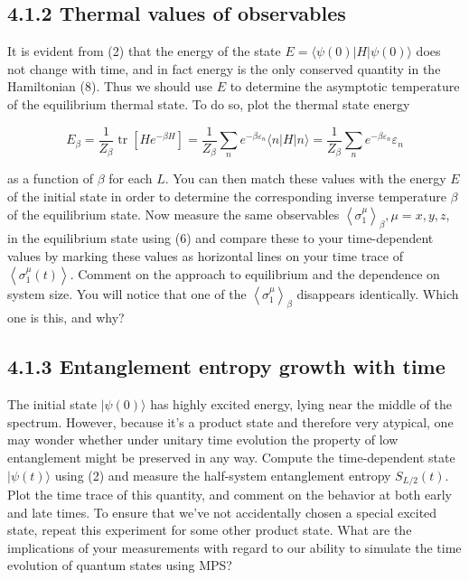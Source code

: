 \documentclass[12pt]{article}
\begin{document}
\subsection*{4.1.2 Thermal values of observables}
It is evident from (2) that the energy of the state $E=\langle\psi(0)|H| \psi(0)\rangle$ does not change with time, and in fact energy is the only conserved quantity in the Hamiltonian (8). Thus we should use $E$ to determine the asymptotic temperature of the equilibrium thermal state. To do so, plot the thermal state energy


\begin{equation*}
E_{\beta}=\frac{1}{Z_{\beta}} \operatorname{tr}\left[H e^{-\beta H}\right]=\frac{1}{Z_{\beta}} \sum_{n} e^{-\beta \varepsilon_{n}}\langle n|H| n\rangle=\frac{1}{Z_{\beta}} \sum_{n} e^{-\beta \varepsilon_{n}} \varepsilon_{n} \tag{10}
\end{equation*}


as a function of $\beta$ for each $L$. You can then match these values with the energy $E$ of the initial state in order to determine the corresponding inverse temperature $\beta$ of the equilibrium state. Now measure the same observables $\left\langle\sigma_{1}^{\mu}\right\rangle_{\beta}, \mu=x, y, z$, in the equilibrium state using (6) and compare these to your time-dependent values by marking these values as horizontal lines on your time trace of $\left\langle\sigma_{1}^{\mu}(t)\right\rangle$. Comment on the approach to equilibrium and the dependence on system size. You will notice that one of the $\left\langle\sigma_{1}^{\mu}\right\rangle_{\beta}$ disappears identically. Which one is this, and why?

\subsection*{4.1.3 Entanglement entropy growth with time}
The initial state $|\psi(0)\rangle$ has highly excited energy, lying near the middle of the spectrum. However, because it's a product state and therefore very atypical, one may wonder whether under unitary time evolution the property of low entanglement might be preserved in any way. Compute the time-dependent state $|\psi(t)\rangle$ using (2) and measure the half-system entanglement entropy $S_{L / 2}(t)$. Plot the time trace of this quantity, and comment on the behavior at both early and late times. To ensure that we've not accidentally chosen a special excited state, repeat this experiment for some other product state. What are the implications of your measurements with regard to our ability to simulate the time evolution of quantum states using MPS?
\end{document}
